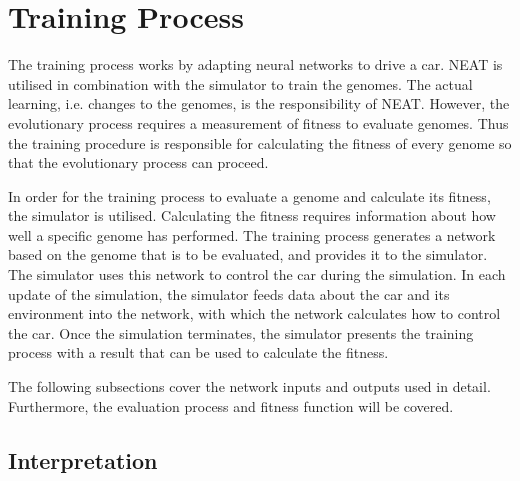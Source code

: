 \section{Training Process}
The training process works by adapting neural networks to drive a car. NEAT is utilised in combination with the simulator to train the genomes. The actual learning, i.e. changes to the genomes, is the responsibility of NEAT. However, the evolutionary process requires a measurement of fitness to evaluate genomes. Thus the training procedure is responsible for calculating the fitness of every genome so that the evolutionary process can proceed. 

In order for the training process to evaluate a genome and calculate its fitness, the simulator is utilised. Calculating the fitness requires information about how well a specific genome has performed. The training process generates a network based on the genome that is to be evaluated, and provides it to the simulator. The simulator uses this network to control the car during the simulation. In each update of the simulation, the simulator feeds data about the car and its environment into the network, with which the network calculates how to control the car. Once the simulation terminates, the simulator presents the training process with a result that can be used to calculate the fitness.

The following subsections cover the network inputs and outputs used in detail. Furthermore, the evaluation process and fitness function will be covered. 

\subsection{Interpretation}
\label{method:interpretation}

